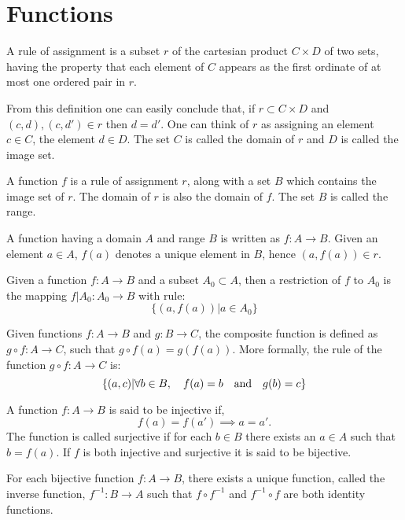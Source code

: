 \section{Functions}
\begin{definition}
A rule of assignment is a subset $r$ of the cartesian product $C\times D$ of two sets, having the property that each element of $C$ appears as the first ordinate of at most one ordered pair in $r$.
\end{definition}
From this definition one can easily conclude that, if $r\subset C\times D$ and $(c,d), (c,d')\in r$ then $d=d'$. One can think of $r$ as assigning an element $c\in C$, the element $d\in D$. The set $C$ is called the domain of $r$ and $D$ is called the image set.
\begin{definition}
  A function $f$ is a rule of assignment $r$, along with a set $B$ which contains the image set of $r$. The domain of $r$ is also the domain of $f$. The set $B$ is called the range.
\end{definition}
A function having a domain $A$ and range $B$ is written as $f:A\to B$. Given an element $a\in A$, $f(a)$ denotes a unique element in $B$, hence $(a,f(a))\in r$.
\begin{definition}
  Given a function $f:A\to B$ and a subset $A_0 \subset A$, then a restriction of $f$ to $A_0$ is the mapping $f|A_0:A_0\to B$ with rule:
  \[\{(a,f(a))|a\in A_0\}\]
\end{definition}
\begin{definition}
    Given functions $f:A\to B$ and $g:B\to C$, the composite function is defined as $g\circ f:A\to C$, such that $g\circ f(a) = g(f(a))$. More formally, the rule of the function $g\circ f: A \to C$ is:
    \[\{(a,c)| \forall b\in B,\quad f(a)=b \qq{and} g(b)=c\}\]
\end{definition}
\begin{definition}
  A function $f:A \to B$ is said to be injective if,
  \[f(a)=f(a') \implies a=a'.\]
  The function is called surjective if for each $b\in B$ there exists an $a\in A$ such that $b = f(a)$. If $f$ is both injective and surjective it is said to be bijective.
\end{definition}
\begin{proposition}\label{pro:2.1}
  For each bijective function $f:A\to B$, there exists a unique function, called the inverse function, $f^{-1}:B\to A$ such that $f\circ f^{-1}$ and $f^{-1}\circ f$ are both identity functions.  
\end{proposition}
